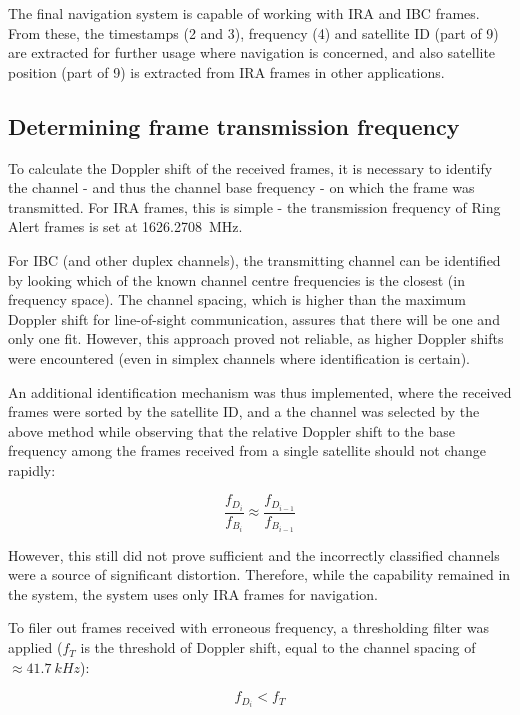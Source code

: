 The final navigation system is capable of working with IRA and IBC frames. From these, the timestamps (2 and 3), frequency (4) and satellite ID (part of 9) are extracted for further usage where navigation is concerned, and also satellite position (part of 9) is extracted from IRA frames in other applications.

\subsection{Determining frame transmission frequency}
To calculate the Doppler shift of the received frames, it is necessary to identify the channel - and thus the channel base frequency -  on which the frame was transmitted. For IRA frames, this is simple - the transmission frequency of Ring Alert frames is set at \qty{1626.2708}{MHz}. 

For IBC (and other duplex channels), the transmitting channel can be identified by looking which of the known channel centre frequencies is the closest (in frequency space). The channel spacing, which is higher than the maximum Doppler shift for line-of-sight communication, assures that there will be one and only one fit. However, this approach proved not reliable, as higher Doppler shifts were encountered (even in simplex channels where identification is certain).

An additional identification mechanism was thus implemented, where the received frames were sorted by the satellite ID, and a the channel was selected by the above method while observing that the relative Doppler shift to the base frequency among the frames received from a single satellite should not change rapidly:

\begin{equation*}
    \frac{f_{D_i}}{f_{B_i}} \approx \frac{f_{D_{i-1}}}{f_{B_{i-1}}} 
\end{equation*}

However, this still did not prove sufficient and the incorrectly classified channels were a source of significant distortion. Therefore, while the capability remained in the system, the system uses only IRA frames for navigation.

To filer out frames received with erroneous frequency, a thresholding filter was applied ($f_T$ is the threshold of Doppler shift, equal to the channel spacing of $\approx\qty{41.7}{kHz}$):

\begin{equation*}
    f_{D_i} < f_T
\end{equation*}


